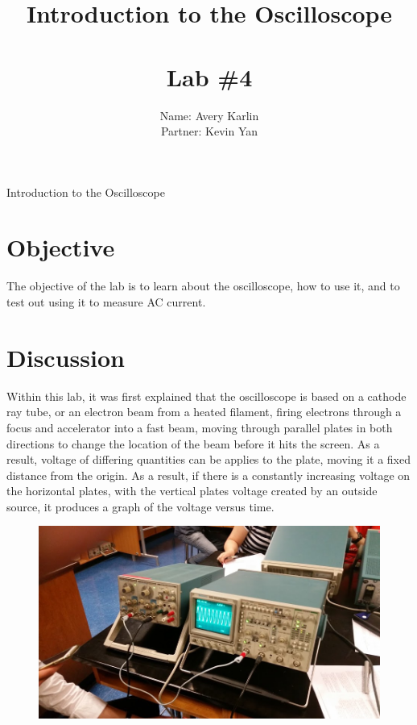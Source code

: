 \documentclass[11pt, titlepage]{article}
\title{Introduction to the Oscilloscope \\ \ \\ \large Lab \#4}
\author{Name: Avery Karlin \\ Partner: Kevin Yan}
\date{}
\begin{document}
\maketitle

\begin{center}
\LARGE Introduction to the Oscilloscope
\end{center}

\section*{Objective}
The objective of the lab is to learn about the oscilloscope, how to use it, and to test out using it to measure AC current.

\section*{Discussion}

Within this lab, it was first explained that the oscilloscope is based on a cathode ray tube, or an electron beam from a heated filament, firing electrons through a focus and accelerator into a fast beam, moving through parallel plates in both directions to change the location of the beam before it hits the screen. As a result, voltage of differing quantities can be applies to the plate, moving it a fixed distance from the origin. As a result, if there is a constantly increasing voltage on the horizontal plates, with the vertical plates voltage created by an outside source, it produces a graph of the voltage versus time.

\begin{figure}[h]
\centering
\hspace*{0cm}
\includegraphics[scale=0.5]{lab41.jpg}
\vspace*{0cm}
\end{figure}
\end{document}
